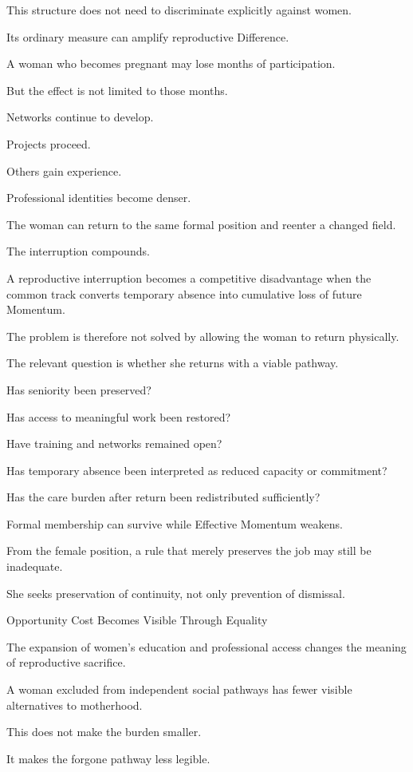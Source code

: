 This structure does not need to discriminate explicitly against women.

Its ordinary measure can amplify reproductive Difference.

A woman who becomes pregnant may lose months of participation.

But the effect is not limited to those months.

Networks continue to develop.

Projects proceed.

Others gain experience.

Professional identities become denser.

The woman can return to the same formal position and reenter a changed field.

The interruption compounds.

A reproductive interruption becomes a competitive disadvantage when the common track converts temporary absence into cumulative loss of future Momentum.

The problem is therefore not solved by allowing the woman to return physically.

The relevant question is whether she returns with a viable pathway.

Has seniority been preserved?

Has access to meaningful work been restored?

Have training and networks remained open?

Has temporary absence been interpreted as reduced capacity or commitment?

Has the care burden after return been redistributed sufficiently?

Formal membership can survive while Effective Momentum weakens.

From the female position, a rule that merely preserves the job may still be inadequate.

She seeks preservation of continuity, not only prevention of dismissal.

Opportunity Cost Becomes Visible Through Equality

The expansion of women’s education and professional access changes the meaning of reproductive sacrifice.

A woman excluded from independent social pathways has fewer visible alternatives to motherhood.

This does not make the burden smaller.

It makes the forgone pathway less legible.

